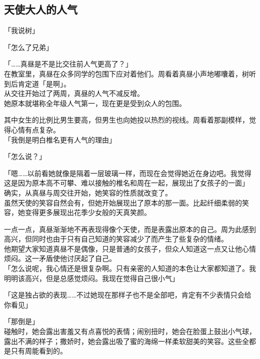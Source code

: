 \subsection{天使大人的人气}

「我说树」

「怎么了兄弟」

「……真昼是不是比交往前人气更高了？」\\

在教室里，真昼在众多同学的包围下应对着他们。周看着真昼小声地嘟囔着，树听到后肯定道「是啊」。\\

从交往开始过了两周，真昼的人气不减反增。\\

她原本就堪称全年级人气第一，现在更是受到众人的包围。

其中女生的比例比男生要高，但男生也向她投以热烈的视线。周看着那副模样，觉得心情有点复杂。\\

「我倒是明白椎名更有人气的理由」

「怎么说？」

「嗯……以前看她就像是隔着一层玻璃一样，而现在会觉得她近在身边吧。我觉得这是因为原本高不可攀、难以接触的椎名和周在一起，展现出了女孩子的一面」\\

确实，从真昼与周交往开始，她笑容的性质就改变了。\\

虽然天使的笑容自然会有，但她开始展现出了原本的那一面。比起纤细柔弱的笑容，她变得更多展现出花季少女般的天真笑颜。

一点一点，真昼渐渐地不再表现得像个天使，而是表露出原本的自己。周为此感到高兴，但同时也由于只有自己知道的笑容减少了而产生了些复杂的情绪。\\

他期望大家知道真昼不是偶像，只是普通的女孩子，但众人知道这一点又让他心情烦闷。这一矛盾使他讨厌起了自己。\\

「怎么说呢，我心情还是很复杂啊。只有亲密的人知道的本色让大家都知道了。我明明该高兴，但是总感觉烦闷。我现在觉得自己很小气」

「这是独占欲的表现……不过她现在那样子也不是全部吧，肯定有不少表情只会给你看见」

「那倒是」\\

碰触时，她会露出害羞又有点喜悦的表情；闹别扭时，她会在脸蛋上鼓出小气球，露出不满的样子；撒娇时，她会露出吸了蜜的海绵一样柔软甜美的笑容。这些全都是只有周能看到的。\\


